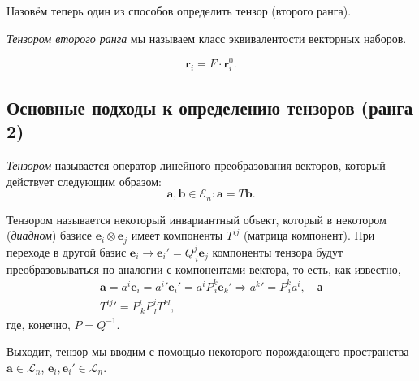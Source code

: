Назовём теперь один из способов определить тензор (второго ранга).
\begin{definition}
  \emph{Тензором второго ранга} мы называем класс эквивалентости векторных наборов.
\end{definition}

\[
  \mathbf{r}_i = F \cdot \mathbf{r}_i^0.
\]



\subsection{Основные подходы к определению тензоров (ранга 2)}
\begin{definition}[алгебраическое]
  \label{tensor-def}
  \emph{Тензором} называется оператор линейного преобразования векторов,
  который действует следующим образом:
  \[
    \mathbf{a}, \mathbf{b} \in \mathcal{E}_n\colon \mathbf{a} = T \mathbf{b}.
  \]
\end{definition}

\renewcommand{\thedefinition}{\ref{tensor-def}$'$}
\addtocounter{definition}{-1}
\begin{definition}
  Тензором называется некоторый инвариантный объект, который в некотором (\emph{диадном}) базисе
   $\mathbf{e}_i \otimes \mathbf{e}_j$ имеет компоненты $T^{ij}$ (матрица компонент).
  При переходе в другой базис $\mathbf{e}_i \to \mathbf{e}_i' = Q^j_{\, i} \mathbf{e}_j$ компоненты тензора
  будут преобразовываться по аналогии с компонентами вектора, то есть, как
  известно,
  \begin{gather*}
    \mathbf{a} = a^i \mathbf{e}_i = {a^i}' {\mathbf{e}_i}' = a^i P^k_{\,i} \mathbf{e}_k'
    \Rightarrow
    {a^k}' = P^k_{\, i} a^i, \quad \text{а}\\
    {T^{ij}}' = P^i_{\, k} P^j_{\, l} T^{kl},
  \end{gather*}
  где, конечно, $ P = Q^{-1} $.
\end{definition}
\renewcommand{\thedefinition}{\arabic{definition}}

Выходит, тензор мы вводим с помощью некоторого порождающего пространства
$\mathbf{a} \in \mathcal{L}_n$, $\mathbf{e}_i, \mathbf{e}_i' \in \mathcal{L}_n$.

